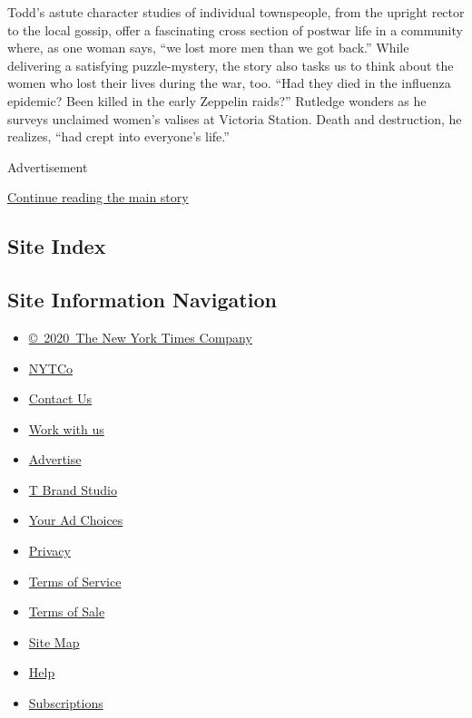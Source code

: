 Todd's astute character studies of individual townspeople, from the
upright rector to the local gossip, offer a fascinating cross section of
postwar life in a community where, as one woman says, ``we lost more men
than we got back.'' While delivering a satisfying puzzle-mystery, the
story also tasks us to think about the women who lost their lives during
the war, too. ``Had they died in the influenza epidemic? Been killed in
the early Zeppelin raids?'' Rutledge wonders as he surveys unclaimed
women's valises at Victoria Station. Death and destruction, he realizes,
``had crept into everyone's life.''

Advertisement

\protect\hyperlink{after-bottom}{Continue reading the main story}

\hypertarget{site-index}{%
\subsection{Site Index}\label{site-index}}

\hypertarget{site-information-navigation}{%
\subsection{Site Information
Navigation}\label{site-information-navigation}}

\begin{itemize}
\tightlist
\item
  \href{https://help.nytimes3xbfgragh.onion/hc/en-us/articles/115014792127-Copyright-notice}{©~2020~The
  New York Times Company}
\end{itemize}

\begin{itemize}
\tightlist
\item
  \href{https://www.nytco.com/}{NYTCo}
\item
  \href{https://help.nytimes3xbfgragh.onion/hc/en-us/articles/115015385887-Contact-Us}{Contact
  Us}
\item
  \href{https://www.nytco.com/careers/}{Work with us}
\item
  \href{https://nytmediakit.com/}{Advertise}
\item
  \href{http://www.tbrandstudio.com/}{T Brand Studio}
\item
  \href{https://www.nytimes3xbfgragh.onion/privacy/cookie-policy\#how-do-i-manage-trackers}{Your
  Ad Choices}
\item
  \href{https://www.nytimes3xbfgragh.onion/privacy}{Privacy}
\item
  \href{https://help.nytimes3xbfgragh.onion/hc/en-us/articles/115014893428-Terms-of-service}{Terms
  of Service}
\item
  \href{https://help.nytimes3xbfgragh.onion/hc/en-us/articles/115014893968-Terms-of-sale}{Terms
  of Sale}
\item
  \href{https://spiderbites.nytimes3xbfgragh.onion}{Site Map}
\item
  \href{https://help.nytimes3xbfgragh.onion/hc/en-us}{Help}
\item
  \href{https://www.nytimes3xbfgragh.onion/subscription?campaignId=37WXW}{Subscriptions}
\end{itemize}
